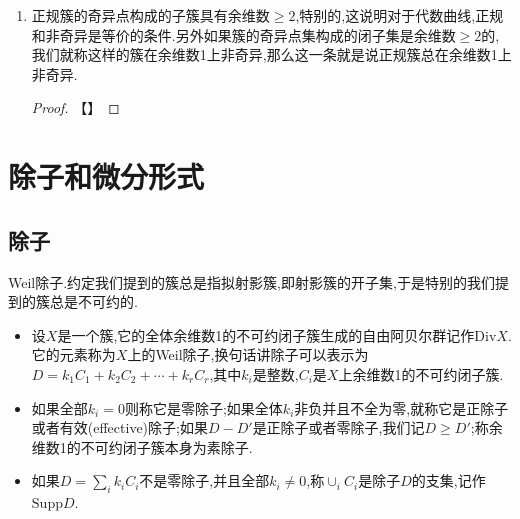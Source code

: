 \begin{enumerate}
\begin{proof}
		【】
	\end{proof}
    \item 正规簇的奇异点构成的子簇具有余维数$\ge2$,特别的,这说明对于代数曲线,正规和非奇异是等价的条件.另外如果簇的奇异点集构成的闭子集是余维数$\ge2$的,我们就称这样的簇在余维数1上非奇异,那么这一条就是说正规簇总在余维数1上非奇异.
    \begin{proof}
    	
    	【】
    \end{proof}
\end{enumerate}





\newpage
\section{除子和微分形式}
\subsection{除子}

Weil除子.约定我们提到的簇总是指拟射影簇,即射影簇的开子集,于是特别的我们提到的簇总是不可约的.
\begin{itemize}
	\item 设$X$是一个簇,它的全体余维数1的不可约闭子簇生成的自由阿贝尔群记作$\mathrm{Div}X$.它的元素称为$X$上的Weil除子,换句话讲除子可以表示为$D=k_1C_1+k_2C_2+\cdots+k_rC_r$,其中$k_i$是整数,$C_i$是$X$上余维数1的不可约闭子簇.
	\item 如果全部$k_i=0$则称它是零除子;如果全体$k_i$非负并且不全为零,就称它是正除子或者有效(effective)除子;如果$D-D'$是正除子或者零除子,我们记$D\ge D'$;称余维数1的不可约闭子簇本身为素除子.
	\item 如果$D=\sum_ik_iC_i$不是零除子,并且全部$k_i\not=0$,称$\cup_iC_i$是除子$D$的支集,记作$\mathrm{Supp}D$.
\end{itemize}


